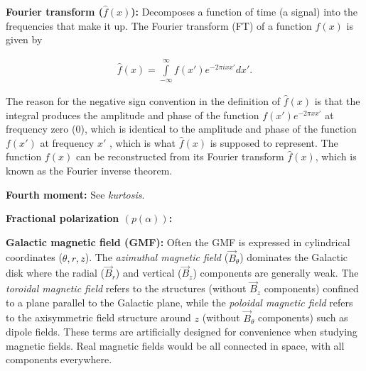 \documentclass[a4paper,10pt]{article}
\begin{document}
{\noindent}\textbf{Fourier transform ($\hat{f}(x)$):} Decomposes a function of time (a signal) into the frequencies that make it up. The Fourier transform (FT) of a function $f(x)$ is given by

\begin{align*}
    \hat{f}(x) = \int\limits_{-\infty}^\infty f(x')e^{-2\pi ixx'}dx'.
\end{align*}

{\noindent}The reason for the negative sign convention in the definition of $\hat{f}(x)$ is that the integral produces the amplitude and phase of the function $f(x')e^{-2\pi xx'}$ at frequency zero ($0$), which is identical to the amplitude and phase of the function $f(x')$ at frequency $x'$ , which is what $\hat{f}(x)$ is supposed to represent. The function $f(x)$ can be reconstructed from its Fourier transform $\hat{f}(x)$, which is known as the Fourier inverse theorem.

{\noindent}\textbf{Fourth moment:} See \textit{kurtosis}.

{\noindent}\textbf{Fractional polarization $(p(\alpha))$:}

{\noindent}\textbf{Galactic magnetic field (GMF):} Often the GMF is expressed in cylindrical coordinates ($\theta, r, z$). The \textit{azimuthal magnetic field} ($\vec{B}_\theta$) dominates the Galactic disk where the radial ($\vec{B}_r$) and vertical ($\vec{B}_z$) components are generally weak. The \textit{toroidal magnetic field} refers to the structures (without $\vec{B}_z$ components) confined to a plane parallel to the Galactic plane, while the \textit{poloidal magnetic field} refers to the axisymmetric field structure around $z$ (without $\vec{B}_\theta$ components) such as dipole fields. These terms are artificially designed for convenience when studying magnetic fields. Real magnetic fields would be all connected in space, with all components everywhere.
\end{document}
